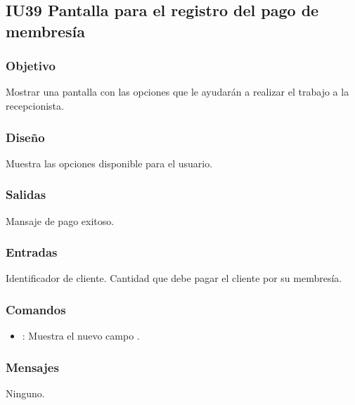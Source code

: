 \subsection{IU39 Pantalla para el registro del pago de membresía}

\subsubsection{Objetivo}
	Mostrar una pantalla con las opciones que le ayudarán a realizar el trabajo a la recepcionista.

\subsubsection{Diseño}
	Muestra las opciones disponible para el usuario.


\subsubsection{Salidas}

	Mansaje de pago exitoso.

\subsubsection{Entradas}
	Identificador de cliente. Cantidad que debe pagar el cliente por su membresía.

\subsubsection{Comandos}
\begin{itemize}
	\item {}: Muestra el nuevo campo .
\end{itemize}

\subsubsection{Mensajes}
	\begin{Citemize}
		\item Ninguno.
	\end{Citemize}

	
